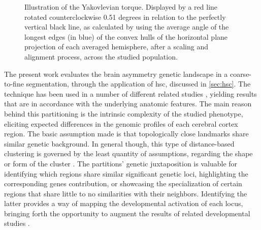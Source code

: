\begin{figure}
	\centering
	
	\caption{Illustration of the Yakovlevian torque. Displayed by a red line rotated counterclockwise 0.51 degrees in relation to the perfectly vertical black line, as calculated by using the average angle of the longest edges (in blue) of the convex hulls of the horizontal plane projection of each averaged hemisphere, after a scaling and alignment process, across the studied population.}
	\label{fig:yaktorque}
\end{figure}

The present work evaluates the brain asymmetry genetic landscape in a coarse-to-fine segmentation, through the application of \ac{hsc}\cite{Ng2002}, discussed in \autoref{sec:hsc}. The technique has been used in a number of different related studies \cite{Claes2018}\cite{Naqvi2021}, yielding results that are in accordance with the underlying anatomic features. The main reason behind this partitioning is the intrinsic complexity of the studied phenotype, eliciting expected differences in the genomic profiles of each cerebral cortex region. The basic assumption made is that topologically close landmarks share similar genetic background. In general though, this type of distance-based clustering is governed by the least quantity of assumptions, regarding the shape or form of the cluster \cite{VonLuxburg2007}. The partitions' genetic juxtaposition is valuable for identifying which regions share similar significant genetic loci, highlighting the corresponding genes contribution, or showcasing the specialization of certain regions that share little to no similarities with their neighbors. Identifying the latter provides a way of mapping the developmental activation of each locus, bringing forth the opportunity to augment the results of related developmental studies \cite{Vijayakumar2016}.

